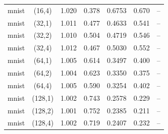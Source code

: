 \begin{tabular}{lcccccc}
mnist & (16,4) & 1.020 & 0.378 & 0.6753 & 0.670 & -- \\
mnist & (32,1) & 1.011 & 0.477 & 0.4633 & 0.541 & -- \\
mnist & (32,2) & 1.010 & 0.504 & 0.4719 & 0.546 & -- \\
mnist & (32,4) & 1.012 & 0.467 & 0.5030 & 0.552 & -- \\
mnist & (64,1) & 1.005 & 0.614 & 0.3497 & 0.400 & -- \\
mnist & (64,2) & 1.004 & 0.623 & 0.3350 & 0.375 & -- \\
mnist & (64,4) & 1.005 & 0.590 & 0.3254 & 0.402 & -- \\
mnist & (128,1) & 1.002 & 0.743 & 0.2578 & 0.229 & -- \\
mnist & (128,2) & 1.001 & 0.752 & 0.2385 & 0.211 & -- \\
mnist & (128,4) & 1.002 & 0.719 & 0.2407 & 0.232 & -- \\
\bottomrule
\end{tabular}
